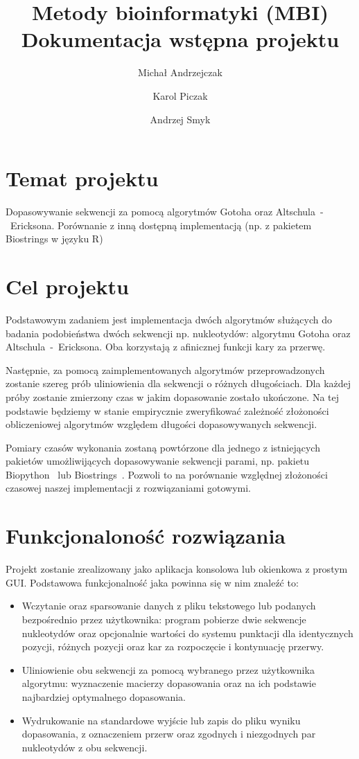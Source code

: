 \documentclass[a4paper,10pt]{article}
\title{Metody bioinformatyki (MBI)\\Dokumentacja wstępna projektu}
\author{Michał Andrzejczak\and Karol Piczak\and	Andrzej Smyk}
\begin{document}
	\maketitle
	\section{Temat projektu}

	Dopasowywanie sekwencji za pomocą algorytmów Gotoha oraz \linebreak\mbox{Altschula - Ericksona}. Porównanie z inną dostępną implementacją (np. z pakietem Biostrings w języku R)

	\section{Cel projektu}

	Podstawowym zadaniem jest implementacja dwóch algorytmów służących do badania podobieństwa dwóch sekwencji np. nukleotydów: algorytmu Gotoha oraz \mbox{Altschula - Ericksona}. Oba korzystają z afinicznej funkcji kary za przerwę. 

	Następnie, za pomocą zaimplementowanych algorytmów przeprowadzonych zostanie szereg prób uliniowienia dla sekwencji o różnych długościach. Dla każdej próby zostanie zmierzony czas w jakim dopasowanie zostało ukończone. Na tej podstawie będziemy w stanie empirycznie zweryfikować zależność złożoności obliczeniowej algorytmów względem długości dopasowywanych sekwencji. 

	Pomiary czasów wykonania zostaną powtórzone dla jednego z istniejących pakietów umożliwijących dopasowywanie sekwencji parami, np. pakietu Biopython~\cite{biopython} lub Biostrings~\cite{biostrings}. Pozwoli to na porównanie względnej złożoności czasowej naszej implementacji z rozwiązaniami gotowymi. 

	\section{Funkcjonaloność rozwiązania}

	Projekt zostanie zrealizowany jako aplikacja konsolowa lub okienkowa z prostym GUI. Podstawowa funkcjonalność jaka powinna się w nim znaleźć to:
	\begin{itemize}
		\item Wczytanie oraz sparsowanie danych z pliku tekstowego lub podanych bezpośrednio przez użytkownika: program pobierze dwie sekwencje nukleotydów oraz opcjonalnie wartości do systemu punktacji dla identycznych pozycji, różnych pozycji oraz kar za rozpoczęcie i kontynuację przerwy.
		\item Uliniowienie obu sekwencji za pomocą wybranego przez użytkownika algorytmu: wyznaczenie macierzy dopasowania oraz na ich podstawie najbardziej optymalnego dopasowania. 
		\item Wydrukowanie na standardowe wyjście lub zapis do pliku wyniku dopasowania, z oznaczeniem przerw oraz zgodnych i niezgodnych par nukleotydów z obu sekwencji.
	\end{itemize}
\end{document}
